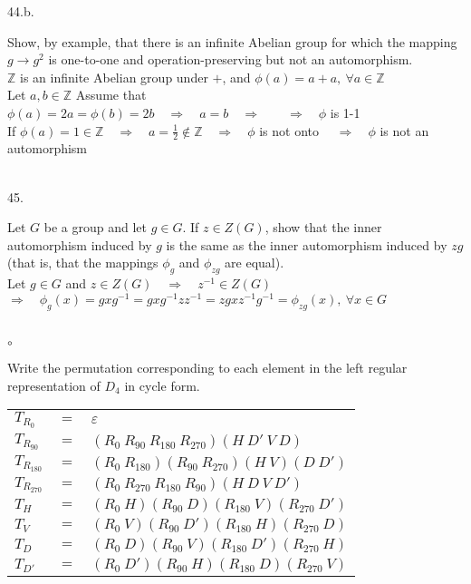 \documentclass[12pt]{book}
\begin{document}
\begin{CJK}{UTF8}{bsmi}
44.b. \begin{minipage}[t]{\dimexpr\linewidth-2em}
Show, by example, that there is an infinite Abelian group for which the mapping $g\rightarrow g^2$ is one-to-one and operation-preserving but not an automorphism. \\
$\mathbb{Z}$ is an infinite Abelian group under $+$, and $\phi(a)=a+a,\ \forall a\in\mathbb{Z}$ \\
Let $a, b\in\mathbb{Z}$
Assume that $\phi(a)=2a=\phi(b)=2b\quad\Rightarrow\quad a=b\quad\Rightarrow\quad\quad\Rightarrow\quad\phi$ is 1-1 \\
If $\phi(a)=1\in\mathbb{Z}\quad\Rightarrow\quad a=\frac{1}{2}\notin\mathbb{Z}\quad\Rightarrow\quad\phi$ is not onto $\quad\Rightarrow\quad\phi$ is not an automorphism
\end{minipage} \\

45. \begin{minipage}[t]{\dimexpr\linewidth-2em}
Let $G$ be a group and let $g\in G$. If $z\in Z(G)$, show that the inner automorphism induced by $g$ is the same as the inner automorphism induced by $zg$ (that is, that the mappings $\phi_{g}$ and $\phi_{zg}$ are equal). \\
Let $g\in G$ and $z\in Z(G)\quad\Rightarrow\quad z^{-1}\in Z(G)$ \\
$\Rightarrow\quad \phi_g(x)=gxg^{-1}=gxg^{-1}zz^{-1}=zgxz^{-1}g^{-1}=\phi_{zg}(x),\ \forall x\in G$
\end{minipage} \\

$\circ$ \begin{minipage}[t]{\dimexpr\linewidth-2em}
Write the permutation corresponding to each element in the left regular representation of $D_4$ in cycle form. \\
\begin{tabular}{lll}
    $T_{R_0}$ & $=$ & $\varepsilon$ \\
    $T_{R_{90}}$ & $=$ & $(R_0\ R_{90}\ R_{180}\ R_{270})(H\ D'\ V\ D)$ \\
    $T_{R_{180}}$ & $=$ & $(R_0\ R_{180})(R_{90}\ R_{270})(H\ V)(D\ D')$ \\
    $T_{R_{270}}$ & $=$ & $(R_0\ R_{270}\ R_{180}\ R_{90})(H\ D\ V\ D')$ \\
    $T_{H}$ & $=$ & $(R_0\ H)(R_{90}\ D)(R_{180}\ V)(R_{270}\ D')$ \\
    $T_{V}$ & $=$ & $(R_0\ V)(R_{90}\ D')(R_{180}\ H)(R_{270}\ D)$ \\
    $T_{D}$ & $=$ & $(R_0\ D)(R_{90}\ V)(R_{180}\ D')(R_{270}\ H)$ \\
    $T_{D'}$ & $=$ & $(R_0\ D')(R_{90}\ H)(R_{180}\ D)(R_{270}\ V)$ \\
\end{tabular}
\end{minipage}

\end{CJK}
\end{document}
